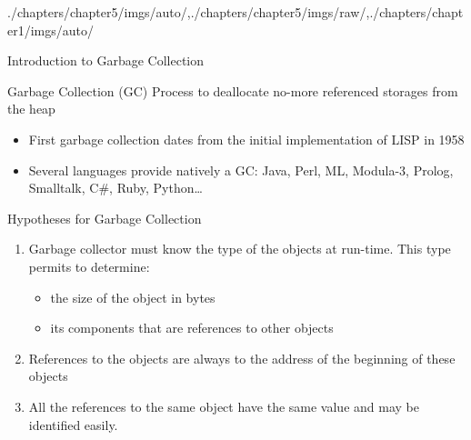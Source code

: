 \begin{graphicspathcontext}{{./chapters/chapter5/imgs/auto/},{./chapters/chapter5/imgs/raw/},{./chapters/chapter1/imgs/auto/}}
\begin{bibunit}[apalike]
\begin{frame}{Introduction to Garbage Collection}
	\vspace{.25cm}
	\begin{definitionblock}{Garbage Collection (GC)}
		Process to deallocate no-more referenced storages from the heap
	\end{definitionblock}
	\vspace{.25cm}
	\begin{itemize}
		\item First garbage collection dates from the initial implementation of LISP in 1958
		\item Several languages provide natively a GC: Java, Perl, ML, Modula-3, Prolog, Smalltalk, C\#, Ruby, Python\dots
	\end{itemize}
\end{frame}

\begin{frame}[background=6]{Hypotheses for Garbage Collection}
	\begin{enumerate}
		\item Garbage collector must know the type of the objects at run-time. This type permits to determine:
		\begin{itemize}
			\item the size of the object in bytes
			\item its components that are references to other objects
		\end{itemize}
		\vspace{.25cm}
		\item References to the objects are always to the address of the beginning of these objects
		\vspace{.25cm}
		\item All the references to the same object have the same value and may be identified easily.
	\end{enumerate}
\end{frame}


\end{bibunit}
\end{graphicspathcontext}
